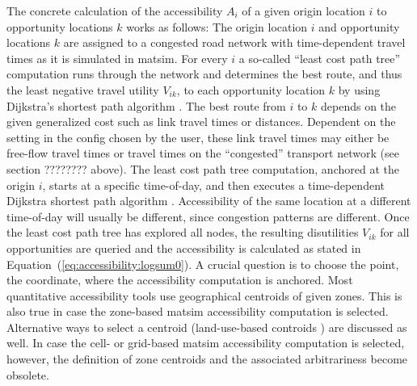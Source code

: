 The concrete calculation of the accessibility $A_i$ of a given origin location $i$ to opportunity locations $k$ works as 
follows: The origin location $i$ and opportunity locations $k$ are assigned to a congested road network with time-dependent 
travel times as it is simulated in \gls{matsim}. For every $i$ a so-called ``least cost path tree'' computation runs through the 
network and determines the best route, and thus the least negative travel utility $V_{ik}$, to each opportunity location 
$k$ by using Dijkstra's shortest path algorithm \citep{Dijkstra1959ShortestPath}. The best route from $i$ to $k$ depends 
on the given generalized cost such as link travel times or distances. 
%
Dependent on the setting in the config chosen by the user, these link travel times may either be free-flow travel times or
travel times on the ``congested'' transport network (see section ???????? above). 
The least cost path tree computation, 
anchored at the origin $i$, starts at a specific time-of-day, and then executes a time-dependent Dijkstra shortest path 
algorithm \citep{LefebvreBalmer2007Fastshortestpath}. Accessibility of the same location at a different time-of-day will 
usually be different, since congestion patterns are different.
%
Once the least cost path tree has explored all 
nodes, the resulting disutilities $V_{ik}$ for all opportunities are queried and the accessibility is calculated as 
stated in Equation~(\ref{eq:accessibility:logsum0}).
%
A crucial question is to choose the point, \ie the coordinate, where the accessibility computation is anchored. Most
quantitative accessibility tools use geographical centroids of given zones. This is also true in case the zone-based 
\gls{matsim} accessibility computation is selected. Alternative ways to select a centroid (\eg land-use-based
controids \citep{BuettnerEtAl2010Erreichbarkeitsatlas}) are discussed as well. In case the cell- or grid-based 
\gls{matsim} accessibility computation is selected, however, the definition of zone centroids and the associated arbitrariness
become obsolete.


